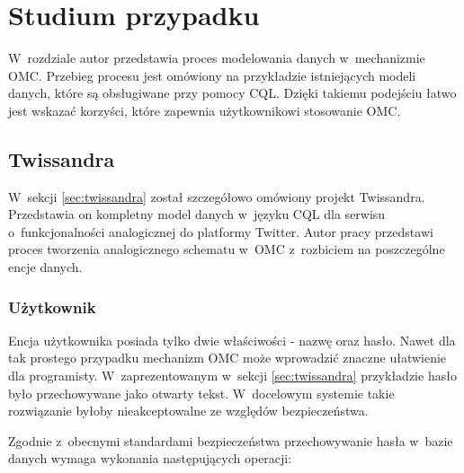 
\chapter{Studium przypadku}
\label{chap:case_study}

W~rozdziale autor przedstawia proces modelowania danych w~mechanizmie OMC. Przebieg procesu jest omówiony na przykładzie istniejących modeli danych, które są obsługiwane przy pomocy CQL. Dzięki takiemu podejściu łatwo jest wskazać korzyści, które zapewnia użytkownikowi stosowanie OMC.

\section{Twissandra}
\label{sec:case_study_twissandra}

W~sekcji \ref{sec:twissandra} został szczegółowo omówiony projekt Twissandra. Przedstawia on kompletny model danych w~języku CQL dla serwisu o~funkcjonalności analogicznej do platformy Twitter. Autor pracy przedstawi proces tworzenia analogicznego schematu w~OMC z~rozbiciem na poszczególne encje danych.

\subsection{Użytkownik}

Encja użytkownika posiada tylko dwie właściwości - nazwę oraz hasło. Nawet dla tak prostego przypadku mechanizm OMC może wprowadzić znaczne ułatwienie dla programisty. W~zaprezentowanym w~sekcji \ref{sec:twissandra} przykładzie hasło było przechowywane jako otwarty tekst. W~docelowym systemie takie rozwiązanie byłoby nieakceptowalne ze względów bezpieczeństwa. 

Zgodnie z~obecnymi standardami bezpieczeństwa przechowywanie hasła w~bazie danych wymaga wykonania następujących operacji:~\cite{how_to_store_users_password_safely}

